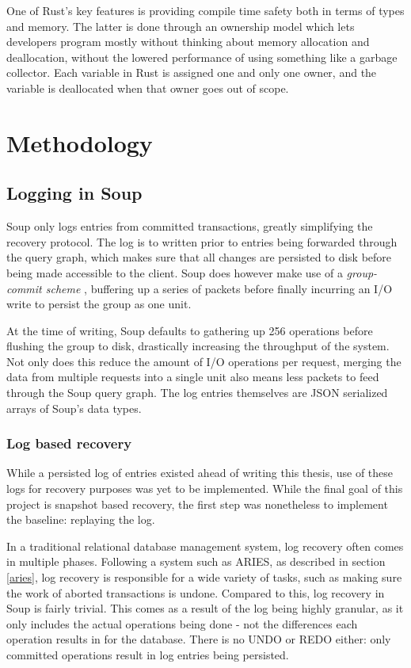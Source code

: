 \documentclass[b5paper]{report}
\begin{document}
One of Rust's key features is providing compile time safety both in terms of
types and memory. The latter is done through an ownership model which lets
developers program mostly without thinking about memory allocation and
deallocation, without the lowered performance of using something like a garbage
collector. Each variable in Rust is assigned one and only one owner, and the
variable is deallocated when that owner goes out of scope.

\chapter{Methodology} \label{chap:methodology}

\section{Logging in Soup} \label{sec:logging}
Soup only logs entries from committed transactions, greatly simplifying the
recovery protocol. The log is to written prior to entries being forwarded
through the query graph, which makes sure that all changes are persisted to disk
before being made accessible to the client. Soup does however make use of a
\textit{group-commit scheme} \cite{main-memory}, buffering up a series of
packets before finally incurring an I/O write to persist the group as one unit.

At the time of writing, Soup defaults to gathering up 256 operations before
flushing the group to disk, drastically increasing the throughput of the system.
Not only does this reduce the amount of I/O operations per request, merging the
data from multiple requests into a single unit also means less packets to feed
through the Soup query graph. The log entries themselves are JSON \cite{json}
serialized arrays of Soup's data types.

\subsection{Log based recovery} \label{sec:log-replay}
While a persisted log of entries existed ahead of writing this thesis, use of
these logs for recovery purposes was yet to be implemented. While the final goal
of this project is snapshot based recovery, the first step was nonetheless to
implement the baseline: replaying the log.

In a traditional relational database management system, log recovery often comes
in multiple phases. Following a system such as ARIES, as described in section
\ref{aries}, log recovery is responsible for a wide variety of tasks, such as
making sure the work of aborted transactions is undone. Compared to this, log
recovery in Soup is fairly trivial. This comes as a result of the log being
highly granular, as it only includes the actual operations being done - not the
differences each operation results in for the database. There is no UNDO or REDO
either: only committed operations result in log entries being persisted.
\end{document}
